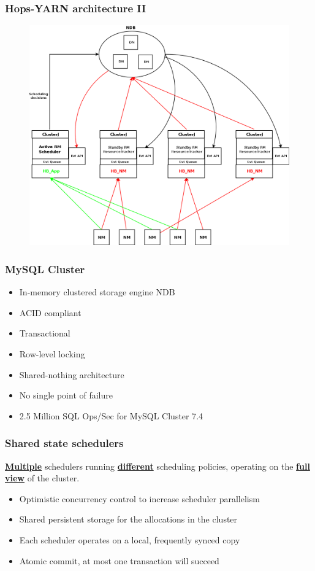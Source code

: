 \documentclass{beamer}
\begin{document}
\begin{frame}
\frametitle{Hops-YARN architecture II}

\begin{figure}
\centering
\includegraphics[scale=0.17]{resources/hopsyarn_arch_components.png}
\end{figure}
\end{frame}


\begin{frame}
\frametitle{MySQL Cluster}
\begin{itemize}
\item In-memory clustered storage engine NDB
\item ACID compliant
\item Transactional
\item Row-level locking
\item Shared-nothing architecture
\item No single point of failure
\item 2.5 Million SQL Ops/Sec for MySQL Cluster 7.4
\end{itemize}
\end{frame}

\begin{frame}
\frametitle{Shared state schedulers}
\textbf{\underline{Multiple}} schedulers running \textbf{\underline{different}} scheduling
policies, operating on the \textbf{\underline{full view}} of the cluster.
\begin{itemize}
\item Optimistic concurrency control to increase scheduler parallelism
\item Shared persistent storage for the allocations in the cluster
\item Each scheduler operates on a local, frequently synced copy
\item Atomic commit, at most one transaction will succeed
\end{itemize}
\end{frame}
\end{document}
